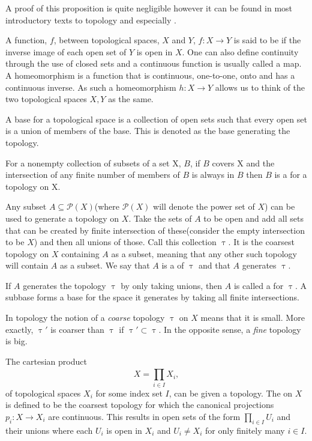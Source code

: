 \documentclass[../../main.tex]{subfiles}
\begin{document}
    A proof of this proposition is quite negligible however it can be found in most introductory texts to topology and especially \cite{armstrong-basictop}.
    
    A function, $f$, between topological spaces, $X$ and $Y$, $f:X\to Y$ is said to be  if the inverse image of each open set of $Y$ is open in $X$. One can also define continuity through the use of closed sets and a continuous function is usually called a map. A homeomorphism is a function that is continuous, one-to-one, onto and has a continuous inverse. As such a homeomorphism $h:X\to Y$ allows us to think of the two topological spaces $X, Y$ as the same. %
    
    A base for a topological space is a collection of open sets such that every open set is a union of members of the base. This is denoted as the base generating the topology.
    
    \begin{definition}
        For a nonempty collection of subsets of a set X, $B$, if $B$ covers X and the intersection of any finite number of members of $B$ is always in $B$ then $B$ is a  for a topology on X.
    \end{definition}
    
    Any subset $A \subseteq \mathcal{P}(X)$(where $\mathcal{P}(X)$ will denote the power set of $X$) can be used to generate a topology on $X$. Take the sets of $A$ to be open and add all sets that can be created by finite intersection of these(consider the empty intersection to be $X$) and then all unions of those. Call this collection $\uptau$. It is the coarsest topology on $X$ containing $A$ as a subset, meaning that any other such topology will contain $A$ as a subset. We say that $A$ is a  of $\uptau$ and that $A$ generates $\uptau$.
    
    If $A$ generates the topology $\uptau$ by only taking unions, then $A$ is called a  for $\uptau$. A subbase forms a base for the space it generates by taking all finite intersections.

    In topology the notion of a \textit{coarse} topology $\uptau$ on $X$ means that it is small. More exactly, $\uptau'$ is coarser than $\uptau$ if $\uptau' \subset \uptau$. In the opposite sense, a \textit{fine} topology is big.
    
    \begin{definition}
        The cartesian product $$X=\prod_{i\in I}^{}X_i,$$ of topological spaces $X_i$ for some index set $I$, can be given a topology. The  on $X$ is defined to be the coarsest topology for which the canonical projections $p_i:X\to X_i$ are continuous. This results in open sets of the form $ \prod_{i\in I}U_i$ and their unions where each $U_i$ is open in $X_i$ and $U_i \ne X_i$ for only finitely many $i\in I$. %
    \end{definition}
\end{document}
